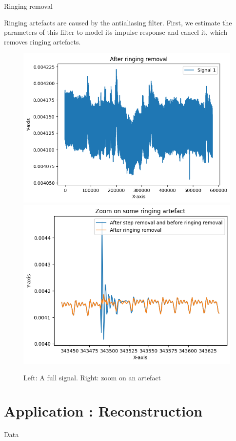 \documentclass[10pt,serif]{beamer}
\begin{document}
\begin{frame}{Ringing removal}

    Ringing artefacts are caused by the antialiasing filter. First, we estimate the parameters of this filter to model its impulse response and cancel it, which removes ringing artefacts.
    \begin{figure}
        \centering
        \includegraphics[width=.4\textwidth]{figures/ringing_removal_real.png}
        \includegraphics[width=.4\textwidth]{figures/ringin_removal_zoom.png}
        \caption{Left: A full signal. Right: zoom on an artefact}
        \label{fig:data}
    \end{figure}
\end{frame}


\section[\color{white} Application]{Application : Reconstruction}\label{sec:results}

\begin{frame}{Data}

\end{frame}
\end{document}
